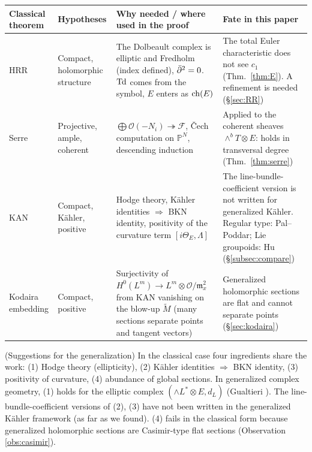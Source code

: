 \begin{center}\small
\begin{tabular}{>{\raggedright\arraybackslash}p{2.3cm}>{\raggedright\arraybackslash}p{2.9cm}>{\raggedright\arraybackslash}p{4.4cm}>{\raggedright\arraybackslash}p{4.6cm}}
\toprule Classical theorem & Hypotheses & Why needed / where used in the proof & Fate in this paper\\\midrule
HRR & Compact, holomorphic structure & The Dolbeault complex is elliptic and Fredholm (index defined), $\bar\partial^2=0$. $\mathrm{Td}$ comes from the symbol, $E$ enters as $\mathrm{ch}(E)$ & The total Euler characteristic does not see $c_1$ (Thm.\ \ref{thm:E}). A refinement is needed (\S\ref{sec:RR})\\\midrule
Serre & Projective, ample, coherent & $\bigoplus\mathcal O(-N_i)\twoheadrightarrow\mathcal F$, \v Cech computation on $\mathbb P^N$, descending induction & Applied to the coherent sheaves $\wedge^bT\otimes E$: holds in transversal degree (Thm.\ \ref{thm:serre})\\\midrule
KAN & Compact, K\"ahler, positive & Hodge theory, K\"ahler identities $\Rightarrow$ BKN identity, positivity of the curvature term $[i\Theta_E,\Lambda]$ & The line-bundle-coefficient version is not written for generalized K\"ahler. Regular type: Pal--Poddar; Lie groupoids: Hu (\S\ref{subsec:compare})\\\midrule
Kodaira embedding & Compact, positive & Surjectivity of $H^0(L^m)\to L^m\otimes\mathcal O/\mathfrak m_x^2$ from KAN vanishing on the blow-up $\tilde M$ (many sections separate points and tangent vectors) & Generalized holomorphic sections are flat and cannot separate points (\S\ref{sec:kodaira})\\\bottomrule
\end{tabular}
\end{center}

\begin{rem}\tK (Suggestions for the generalization)
In the classical case four ingredients share the work: (1) Hodge theory (ellipticity), (2) K\"ahler identities $\Rightarrow$ BKN identity, (3) positivity of curvature, (4) abundance of global sections. In generalized complex geometry, (1) holds for the elliptic complex $(\wedge L^*\otimes E,d_L)$ (Gualtieri \cite{Gua11}). The line-bundle-coefficient versions of (2), (3) have not been written in the generalized K\"ahler framework (as far as we found). (4) fails in the classical form because generalized holomorphic sections are Casimir-type flat sections (Observation \ref{obs:casimir}).
\end{rem}

